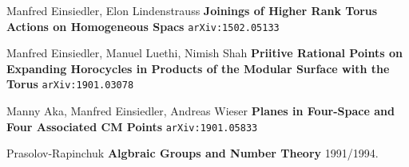 \documentclass[12pt]{article}
\begin{document}
{\vfill

\begin{thebibliography}{}

\item Manfred Einsiedler, Elon Lindenstrauss \textbf{Joinings of Higher Rank Torus Actions on Homogeneous Spacs} \texttt{arXiv:1502.05133}
\item Manfred Einsiedler, Manuel Luethi, Nimish Shah \textbf{Priitive Rational Points on Expanding Horocycles in Products of the Modular Surface with the Torus} \texttt{arXiv:1901.03078} 
\item Manny Aka, Manfred Einsiedler, Andreas Wieser \textbf{Planes in Four-Space and Four Associated CM Points} \texttt{arXiv:1901.05833}
\item Prasolov-Rapinchuk \textbf{Algbraic Groups and Number Theory} 1991/1994.
\end{thebibliography}
}
\end{document}
